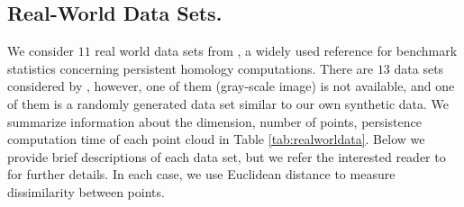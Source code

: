 \newcommand{\sample}{\mathbf{S}}


\subsection{Real-World Data Sets.} \label{sec: realworlddata}
We consider $11$ real world data sets from \cite{roadmap2017}, a widely used reference for benchmark statistics concerning persistent homology computations. There are $13$ data sets considered by \cite{roadmap2017}, however, one of them (gray-scale image) is not available, and one of them is a randomly generated data set %
similar to our own synthetic data. We summarize information about the dimension, number of points, persistence computation time of each point cloud in Table \ref{tab:realworldata}. Below we provide brief descriptions of each data set, but we refer the interested reader to \cite{roadmap2017} for further details. In each case, we use Euclidean distance to measure dissimilarity between points.

